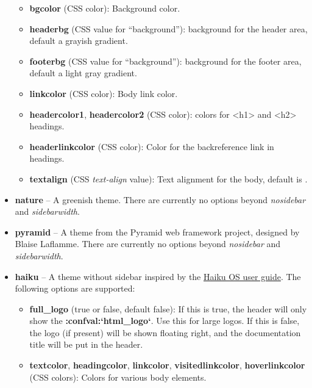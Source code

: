 \documentclass[letterpaper,10pt,english]{sphinxmanual}
\begin{document}
\begin{itemize}
\begin{itemize}
\item {} 
\textbf{bgcolor} (CSS color): Background color.

\item {} 
\textbf{headerbg} (CSS value for ``background''): background for the header area,
default a grayish gradient.

\item {} 
\textbf{footerbg} (CSS value for ``background''): background for the footer area,
default a light gray gradient.

\item {} 
\textbf{linkcolor} (CSS color): Body link color.

\item {} 
\textbf{headercolor1}, \textbf{headercolor2} (CSS color): colors for \textless{}h1\textgreater{} and \textless{}h2\textgreater{}
headings.

\item {} 
\textbf{headerlinkcolor} (CSS color): Color for the backreference link in
headings.

\item {} 
\textbf{textalign} (CSS \emph{text-align} value): Text alignment for the body, default
is .

\end{itemize}

\item {} 
\textbf{nature} -- A greenish theme.  There are currently no options beyond
\emph{nosidebar} and \emph{sidebarwidth}.

\item {} 
\textbf{pyramid} -- A theme from the Pyramid web framework project, designed by
Blaise Laflamme.  There are currently no options beyond \emph{nosidebar} and
\emph{sidebarwidth}.

\item {} 
\textbf{haiku} -- A theme without sidebar inspired by the \href{http://www.haiku-os.org/docs/userguide/en/contents.html}{Haiku OS user guide}.  The following
options are supported:
\begin{itemize}
\item {} 
\textbf{full\_logo} (true or false, default false): If this is true, the header
will only show the {\color{red}\bfseries{}:confval:{}`html\_logo{}`}.  Use this for large logos.  If this
is false, the logo (if present) will be shown floating right, and the
documentation title will be put in the header.

\item {} 
\textbf{textcolor}, \textbf{headingcolor}, \textbf{linkcolor}, \textbf{visitedlinkcolor},
\textbf{hoverlinkcolor} (CSS colors): Colors for various body elements.


\end{itemize}
\end{itemize}
\end{document}
